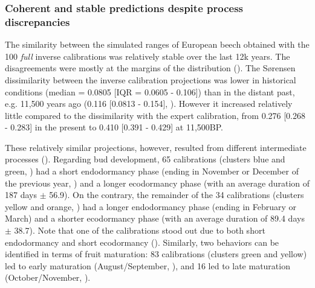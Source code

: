 \subsubsection{Coherent and stable predictions despite process discrepancies}

The similarity between the simulated ranges of European beech obtained with the 100 \emph{full} inverse calibrations was relatively stable over the last 12k years. The disagreements were mostly at the margins of the distribution (). The S\o rensen dissimilarity between the inverse calibration projections was lower in historical conditions (median = 0.0805 [IQR = 0.0605 - 0.106]) than in the distant past, e.g. 11,500 years ago (0.116 [0.0813 - 0.154], ). However it increased relatively little compared to the dissimilarity with the expert calibration, from 0.276 [0.268 - 0.283] in the present to 0.410 [0.391 - 0.429] at 11,500BP.

These relatively similar projections, however, resulted from different intermediate processes (). Regarding bud development, 65 calibrations (clusters blue and green, )  had a short endodormancy phase (ending in November or December of the previous year, ) and a longer ecodormancy phase (with an average duration of 187 days $\pm$ 56.9). On the contrary, the remainder of the 34 calibrations (clusters yellow and orange, ) had a longer endodormancy phase (ending in February or March) and a shorter ecodormancy phase (with an average duration of 89.4 days $\pm$ 38.7). Note that one of the calibrations stood out due to both short endodormancy and short ecodormancy (). Similarly, two behaviors can be identified in terms of fruit maturation: 83 calibrations (clusters green and yellow) led to early maturation (August/September, ), and 16 led to late maturation (October/November, ).


